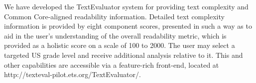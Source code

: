 We have developed the TextEvaluator system for providing text complexity and Common Core-aligned readability information. Detailed text complexity information is provided by eight component scores, presented in such a way as to aid in the user's understanding of the overall readability metric, which is provided as a holistic score on a scale of 100 to 2000. The user may select a targeted US grade level and receive additional analysis relative to it. This and other capabilities are accessible via a feature-rich front-end, located at http://texteval-pilot.ets.org/TextEvaluator/.
